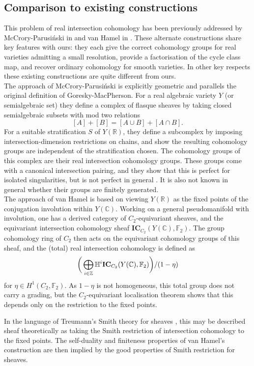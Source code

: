 \documentclass{amsart}
\theoremstyle{definition}
\theoremstyle{remark}
\begin{document}
\subsection{Comparison to existing constructions}
This problem of real intersection cohomology has been previously addressed by  McCrory-Parusiński in \cite{Realintersectionhomology} and van Hamel in \cite{VanHamel}. These alternate constructions share key features with ours: they each give the correct cohomology groups for real varieties admitting a small resolution, provide a factorisation of the cycle class map, and recover ordinary cohomology for smooth varieties. In other key respects these existing constructions are quite different from ours.
\\
The approach of McCrory-Parusiński is explicitly geometric and parallels the original definition of Goresky-MacPherson. For a real algebraic variety $Y$ (or semialgebraic set) they define a complex of flasque sheaves by taking closed semialgebraic subsets with mod two relations \[[A]+[B]=[A\cup B] + [A\cap B].\] For a suitable stratification $S$ of $Y(\mathbb{R})$, they define a subcomplex by imposing intersection-dimension restrictions on chains, and show the resulting cohomology groups are independent of the stratification chosen. The cohomology groups of this complex are their real intersection cohomology groups. These groups come with a canonical intersection pairing, and they show that this is perfect for isolated singularities, but is not perfect in general \cite{MCCRORY2020107050}. It is also not known in general whether their groups are finitely generated.
\\
The approach of van Hamel is based on viewing $Y(\mathbb{R})$ as the fixed points of the conjugation involution within $Y(\mathbb{C})$. Working on a general pseudomanifold with involution, one has a derived category of $C_2$-equivariant sheaves, and the equivariant intersection cohomology sheaf $\mathbf{IC}_{C_2}(Y(\mathbb{C}),\mathbb{F}_2)$. The group cohomology ring of $C_2$ then acts on the equivariant cohomology groups of this sheaf, and the (total) real intersection cohomology is defined as \[\bigg{(}\bigoplus_{i\in \mathbb{Z}}\mathbb{H}^i\mathbf{IC}_{C_2}(Y(\mathbb{C}),\mathbb{F}_2)\bigg{)}/(1-\eta)\] for $\eta\in H^1(C_2,\mathbb{F}_2)$. As $1-\eta$ is not homogeneous, this total group does not carry a grading, but the $C_2$-equivariant localisation theorem shows that this depends only on the restriction to the fixed points.

In the language of Treumann's Smith theory for sheaves \cite{Treumann2019}, this may be described sheaf theoretically as taking the Smith restriction of intersection cohomology to the fixed points. The self-duality and finiteness properties of van Hamel's construction are then implied by the good properties of Smith restriction for sheaves.
\end{document}
